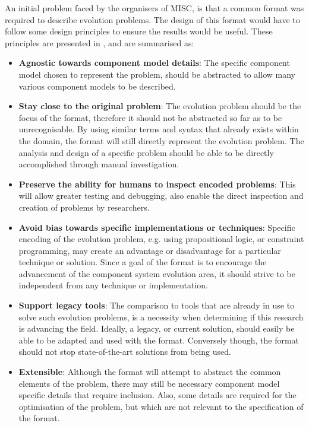 An initial problem faced by the organisers of MISC, is that a common format was required to describe evolution problems.
The design of this format would have to follow some design principles to ensure the results would be useful.
These principles are presented in \citep{treinen2009common}, and are summarised as:

\begin{itemize}
  \item \textbf{Agnostic towards component model details}: 
  The specific component model chosen to represent the problem, should be abstracted to allow many various component models to be described.  
  \item \textbf{Stay close to the original problem}: 
  The evolution problem should be the focus of the format, therefore it should not be abstracted so far as to be unrecognisable. 
  By using similar terms and syntax that already exists within the domain, the format will still directly represent the evolution problem. 
  The analysis and design of a specific problem should be able to be directly accomplished through manual investigation.
  \item \textbf{Preserve the ability for humans to inspect encoded problems}:
  This will allow greater testing and debugging, also enable the direct inspection and creation of problems by researchers.
  \item \textbf{Avoid bias towards specific implementations or techniques}:
  Specific encoding of the evolution problem, e.g. using propositional logic, or constraint programming, may create an advantage or disadvantage for a particular technique or solution.
  Since a goal of the format is to encourage the advancement of the component system evolution area, it should strive to be independent from any technique or implementation. 
  \item \textbf{Support legacy tools}:
  The comparison to tools that are already in use to solve such evolution problems, is a necessity when determining if this research is advancing the field.
  Ideally, a legacy, or current solution, should easily be able to be adapted and used with the format.
  Conversely though, the format should not stop state-of-the-art solutions from being used.
  \item \textbf{Extensible}:
  Although the format will attempt to abstract the common elements of the problem, there may still be necessary component model specific details that require inclusion.
  Also, some details are required for the optimisation of the problem, but which are not relevant to the specification of the format.

\end{itemize}
